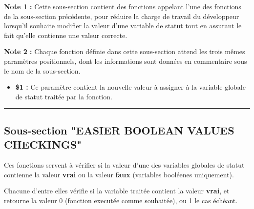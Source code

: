 \documentclass[a4paper,10pt]{article}
\begin{document}
\begin{justify}
    \textbf{Note 1 :} Cette sous-section contient des fonctions appelant l'une des fonctions de la sous-section précédente, pour réduire la charge de travail du développeur lorsqu'il souhaite modifier la valeur d'une variable de statut tout en assurant le fait qu'elle contienne une valeur correcte.
\end{justify}

\begin{justify}
    \textbf{Note 2 :} Chaque fonction définie dans cette sous-section attend les trois mêmes paramètres positionnels, dont les informations sont données en commentaire sous le nom de la sous-section.
\end{justify}

\begin{itemize}
    \item
    {
        \begin{justify}
            \textbf{\$1 :} Ce paramètre contient la nouvelle valeur à assigner à la variable globale de statut traitée par la fonction.
        \end{justify}


    }
\end{itemize}




\color{sec2}\par\noindent\rule{\textwidth}{0.4pt}\color{text}

\color{sec2}
\subsection{Sous-section "EASIER BOOLEAN VALUES CHECKINGS"}\color{text}

\begin{justify}
    Ces fonctions servent à vérifier si la valeur d'une des variables globales de statut contienne la valeur \textbf{vrai} ou la valeur \textbf{faux} (variables booléenes uniquement).
\end{justify}

\begin{justify}
    Chacune d'entre elles vérifie si la variable traitée contient la valeur \textbf{vrai}, et retourne la valeur 0 (fonction executée comme souhaitée), ou 1 le cas échéant.
\end{justify}
\end{document}
